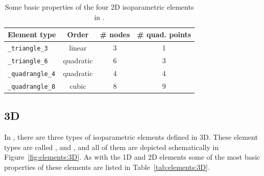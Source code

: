 \begin{table}[!htb]
\begin{center}
\begin{tabular}{l|ccc}
\toprule
Element type & Order & \# nodes & \# quad. points \\
\midrule
\texttt{\_triangle\_3} & linear & 3 & 1 \\
\texttt{\_triangle\_6} & quadratic & 6 & 3 \\
\hline
\texttt{\_quadrangle\_4} & quadratic & 4 & 4 \\
\texttt{\_quadrangle\_8} & cubic & 8 & 9 \\
\bottomrule
\end{tabular}
\end{center}
\caption{Some basic properties of the four 2D isoparametric elements in \akantu.}
\label{tab:elements:2D}
\end{table}

\subsection*{3D}

In \akantu, there are three types of isoparametric elements defined in 3D. These
element types are called ,  and
, and all of them are depicted schematically in
Figure~\ref{fig:elements:3D}. As with the 1D and 2D elements some of the most
basic properties of these elements are listed in Table~\ref{tab:elements:3D}.

